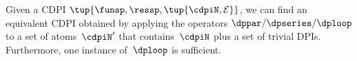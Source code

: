 \begin{proposition}
    \label{prop:reduction}
    Given a CDPI $\tup{\funsp,\ressp, \tup{\cdpiN,\mathcal{E}} } $, we can find an equivalent CDPI obtained by applying the operators $\dppar/\dpseries/\dploop$ to a set of atoms~$\cdpiN'$ that contains~$\cdpiN$ plus a set of trivial DPIs.
    Furthermore, one instance of~$\dploop$ is sufficient.
\end{proposition}
